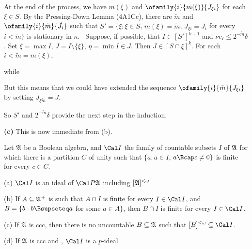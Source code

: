 {At the end of the process, we have $m(\xi)$ and
$\ofamily{i}{m(\xi)}{J_{\xi i}}$ for each
$\xi\in S$.   By the Pressing-Down Lemma (4A1Cc), there are $\tilde m$ and
$\ofamily{i}{\tilde m}{\tilde J_i}$ such that
$S'=\{\xi:\xi\in S$, $m(\xi)=\tilde m$, $J_{\xi i}=\tilde J_i$ for
every $i<\tilde m\}$ is
stationary in $\kappa$.   \Quer\ Suppose, if possible, that
$I\in[S']^{k+1}$ and
$\nu c_I\le 2^{-\tilde m}\delta$.   Set $\xi=\max I$,
$J=I\setminus\{\xi\}$, $\eta=\min I\in J$.
Then $J\in[S\cap\xi]^k$.   For each $i<\tilde m=m(\xi)$,


\noindent while


\noindent  But this means that we could have extended the sequence
$\ofamily{i}{\tilde m}{J_{\xi i}}$ by setting $J_{\xi\tilde m}=J$.\
\Bang

So $S'$ and $2^{-\tilde m}\delta$ provide the next step in the
induction.

\medskip

{\bf (c)} This is now immediate from (b).
}%

 Let
$\frak A$ be a Boolean
algebra, and $\Cal I$ the family of countable subsets $I$ of
$\frak A$ for which there is a partition $C$ of unity
such that $\{a:a\in I$, $a\Bcap c\ne 0\}$ is finite for every $c\in C$.

(a) $\Cal I$ is an ideal of $\Cal P\frak A$ including
$[\frak A]^{<\omega}$.

(b) If $A\subseteq\frak A^+$ is such that $A\cap I$ is
finite for every $I\in\Cal I$, and
$B=\{b:b\Bsupseteq a$ for some $a\in A\}$, then $B\cap I$ is finite
for every $I\in\Cal I$.

(c) If $\frak A$ is ccc, then there is no uncountable
$B\subseteq\frak A$ such that $[B]^{\le\omega}\subseteq\Cal I$.

(d) If $\frak A$ is ccc and \wsid, $\Cal I$ is a
$p$-ideal.

